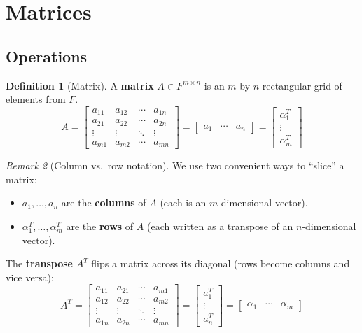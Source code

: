 \documentclass[11pt]{article}
\theoremstyle{definition}
\newtheorem{definition}{Definition}[section]
\theoremstyle{plain}
\theoremstyle{remark}
\newtheorem{remark}[definition]{Remark}
\begin{document}
\newpage
\section{Matrices}

\subsection{Operations}

\begin{definition}[Matrix]
A \textbf{matrix} $A \in F^{m \times n}$ is an $m$ by $n$ rectangular grid of elements from $F$.
\[
A = \begin{bmatrix} a_{11} & a_{12} & \cdots & a_{1n} \\ a_{21} & a_{22} & \cdots & a_{2n} \\ \vdots & \vdots & \ddots & \vdots \\ a_{m1} & a_{m2} & \cdots & a_{mn} \end{bmatrix} = \begin{bmatrix} a_1 & \cdots & a_n \end{bmatrix} = \begin{bmatrix} \alpha_1^T \\ \vdots \\ \alpha_m^T \end{bmatrix}
\]
\end{definition}

\begin{remark}[Column vs.\ row notation]
We use two convenient ways to ``slice'' a matrix:
\begin{itemize}[nosep]
  \item $a_1, \ldots, a_n$ are the \textbf{columns} of $A$ (each is an $m$-dimensional vector).
  \item $\alpha_1^T, \ldots, \alpha_m^T$ are the \textbf{rows} of $A$ (each written as a transpose of an $n$-dimensional vector).
\end{itemize}
\end{remark}

The \textbf{transpose} $A^T$ flips a matrix across its diagonal (rows become columns and vice versa):
\[
A^T = \begin{bmatrix} a_{11} & a_{21} & \cdots & a_{m1} \\ a_{12} & a_{22} & \cdots & a_{m2} \\ \vdots & \vdots & \ddots & \vdots \\ a_{1n} & a_{2n} & \cdots & a_{mn} \end{bmatrix} = \begin{bmatrix} a_1^T \\ \vdots \\ a_n^T \end{bmatrix} = \begin{bmatrix} \alpha_1 & \cdots & \alpha_m \end{bmatrix}
\]
\end{document}
